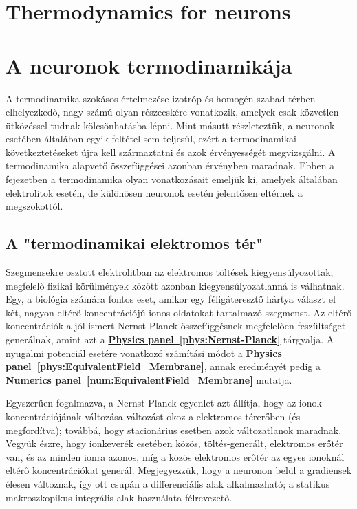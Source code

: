 
\ifx\magyar\undefined
\chapter{Thermodynamics for neurons\label{ch:Thermodynamics}}
\else
\chapter[A neuronok termodinamikája]{A neuronok termodinamikája\label{ch:Thermodynamics}}
\fi
\iflatexml
\else
\minitoc
\fi

A termodinamika szokásos értelmezése izotróp és homogén szabad térben elhelyezkedő, nagy számú olyan részecskére vonatkozik, amelyek csak közvetlen ütközéssel tudnak kölcsönhatásba lépni. Mint másutt részleteztük, a neuronok esetében általában egyik feltétel sem teljesül, ezért a termodinamikai következtetéseket újra kell származtatni és azok érvényességét megvizsgálni. A termodinamika alapvető összefüggései azonban érvényben maradnak. Ebben a fejezetben a termodinamika  olyan vonatkozásait emeljük ki, amelyek általában elektrolitok esetén, de különösen neuronok esetén jelentősen eltérnek a megszokottól.

\section[Termodinamikus tér]{A "termodinamikai elektromos tér" \label{sec:Physics-ThermodynamicField}}
\fi


Szegmensekre osztott elektrolitban az elektromos töltések kiegyensúlyozottak; megfelelő fizikai körülmények között
azonban kiegyensúlyozatlanná is válhatnak.
Egy, a biológia számára fontos eset, amikor egy féligáteresztő hártya
választ el két, nagyon eltérő koncentrációjú ionos oldatokat
tartalmazó szegmenst. Az eltérő koncentrációk 
a jól ismert Nernst-Planck összefüggésnek megfelelően feszültséget generálnak, amint azt a 
\hyperlink{phys:Nernst-Planck}
{\textbf{Physics panel~\ref{phys:Nernst-Planck}}} tárgyalja.
A nyugalmi potenciál esetére vonatkozó számítási módot a \hyperlink{phys:EquivalentField_Membrane}
{\textbf{Physics panel~\ref{phys:EquivalentField_Membrane}}},
annak eredményét pedig a 
\hyperlink{num:EquivalentField_Membrane}
{\textbf{Numerics panel~\ref{num:EquivalentField_Membrane}}} mutatja.

Egyszerűen fogalmazva, a Nernst-Planck egyenlet azt állítja,
hogy az ionok koncentrációjának változása változást okoz a
elektromos térerőben (és megfordítva);
továbbá, hogy stacionárius esetben azok változatlanok maradnak.
Vegyük észre, hogy ionkeverék esetében közös, töltés-generált,
elektromos erőtér van, és az minden ionra azonos, míg a közös
elektromos erőtér az egyes ionoknál eltérő koncentrációkat generál. 
Megjegyezzük, hogy a neuronon belül a gradiensek élesen változnak,
így ott csupán a differenciális alak alkalmazható;
a statikus makroszkopikus integrális alak használata félrevezető.

